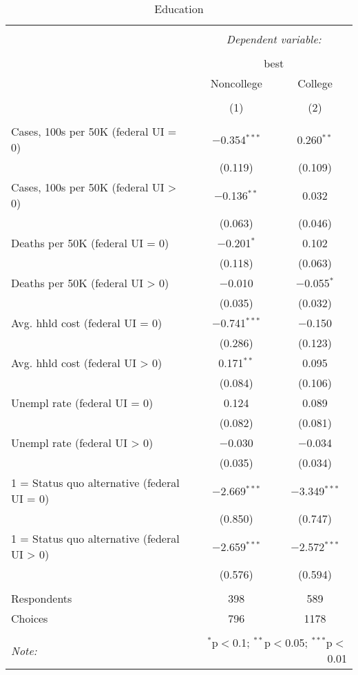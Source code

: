 
\begin{table}[!htbp] \centering 
  \caption{Education} 
  \label{} 
\begin{tabular}{@{\extracolsep{5pt}}lcc} 
\\[-1.8ex]\hline 
\hline \\[-1.8ex] 
 & \multicolumn{2}{c}{\textit{Dependent variable:}} \\ 
\cline{2-3} 
\\[-1.8ex] & \multicolumn{2}{c}{best} \\ 
 & Noncollege & College \\ 
\\[-1.8ex] & (1) & (2)\\ 
\hline \\[-1.8ex] 
 Cases, 100s per 50K (federal UI = 0) & $-$0.354$^{***}$ & 0.260$^{**}$ \\ 
  & (0.119) & (0.109) \\ 
  Cases, 100s per 50K (federal UI > 0) & $-$0.136$^{**}$ & 0.032 \\ 
  & (0.063) & (0.046) \\ 
  Deaths per 50K (federal UI = 0) & $-$0.201$^{*}$ & 0.102 \\ 
  & (0.118) & (0.063) \\ 
  Deaths per 50K (federal UI > 0) & $-$0.010 & $-$0.055$^{*}$ \\ 
  & (0.035) & (0.032) \\ 
  Avg. hhld cost (federal UI = 0) & $-$0.741$^{***}$ & $-$0.150 \\ 
  & (0.286) & (0.123) \\ 
  Avg. hhld cost (federal UI > 0) & 0.171$^{**}$ & 0.095 \\ 
  & (0.084) & (0.106) \\ 
  Unempl rate (federal UI = 0) & 0.124 & 0.089 \\ 
  & (0.082) & (0.081) \\ 
  Unempl rate (federal UI > 0) & $-$0.030 & $-$0.034 \\ 
  & (0.035) & (0.034) \\ 
  1 = Status quo alternative (federal UI = 0) & $-$2.669$^{***}$ & $-$3.349$^{***}$ \\ 
  & (0.850) & (0.747) \\ 
  1 = Status quo alternative (federal UI > 0) & $-$2.659$^{***}$ & $-$2.572$^{***}$ \\ 
  & (0.576) & (0.594) \\ 
 \hline \\[-1.8ex] 
Respondents & 398 & 589\\ 
 Choices & 796 & 1178\\ 
\hline 
\hline \\[-1.8ex] 
\textit{Note:}  & \multicolumn{2}{r}{$^{*}$p$<$0.1; $^{**}$p$<$0.05; $^{***}$p$<$0.01} \\ 
\end{tabular} 
\end{table} 
